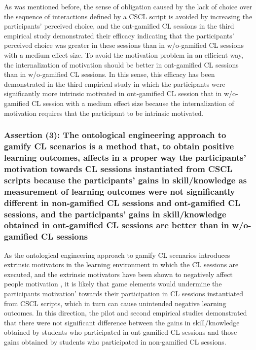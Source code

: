 As was mentioned before, the sense of obligation caused by the lack of choice over the sequence of interactions defined by a CSCL script is avoided by increasing the participants' perceived choice, and the ont-gamified CL sessions in the third empirical study demonstrated their efficacy indicating that the participants' perceived choice  was greater in these sessions than in w/o-gamified CL sessions with a medium effect size. 
To avoid the motivation problem in an efficient way, the internalization of motivation should be better in ont-gamified CL sessions than in w/o-gamified CL sessions. In this sense, this efficacy has been demonstrated in the third empirical study in which the participants were significantly more intrinsic motivated in ont-gamified CL session that in w/o-gamified CL session with a medium effect size because the internalization of motivation requires that the participant to be intrinsic motivated.

\subsubsection*{Assertion (3): The ontological engineering approach to gamify CL scenarios is a method that, to obtain positive learning outcomes, affects in a proper way the participants' motivation towards CL sessions instantiated from CSCL scripts because the participants' gains in skill/knowledge as measurement of learning outcomes were not significantly different in non-gamified CL sessions and ont-gamified CL sessions, and the participants' gains in skill/knowledge obtained in ont-gamified CL sessions are better than in w/o-gamified CL sessions}

As the ontological engineering approach to gamify CL scenarios introduces extrinsic motivators in the learning environment in which the CL sessions are executed, and the extrinsic motivators have been shown to negatively affect people motivation \cite{BenabouTirole2003, FreyJegen1999}, it is likely that game elements would undermine the participants motivation' towards their participation in CL sessions instantiated from CSCL scripts, which in turn can cause unintended negative learning outcomes. In this direction, the pilot and second empirical studies demonstrated that there were not significant difference between the gains in skill/knowledge obtained by students who participated in ont-gamified CL sessions and those gains obtained by students who participated in non-gamified CL sessions.

